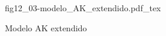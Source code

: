 \begin{figure}[h]
\centering
\def\svgwidth{0.5\textwidth}
{fig12_03-modelo_AK_extendido.pdf_tex}
\caption{Modelo AK extendido}
\label{fig12_03-modelo_AK_extendido}
\end{figure}